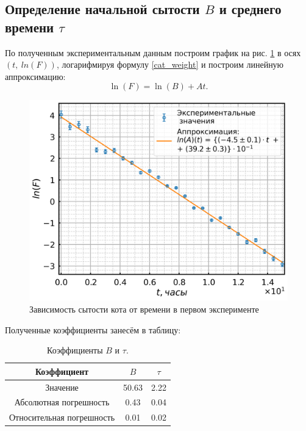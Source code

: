 \documentclass[12pt,a4paper]{article}
\begin{document}
\subsection{Определение начальной сытости $B$ и среднего времени $\tau$}

По полученным экспериментальным данным построим график на рис. \ref{fig_1} в осях $(t,~ ln(F))$, логарифмируя формулу \eqref{cat_weight} и построим линейную аппроксимацию:
    \begin{equation}
        \ln(F) = \ln(B) + At.
    \end{equation}

\begin{figure}[h!]
    \begin{center}
    		\includegraphics[scale=0.55]{plot_1.png}
    \caption{Зависимость сытости кота от времени в первом эксперименте}\label{fig_1}
    \end{center}
	\end{figure}

Полученные коэффициенты занесём в таблицу:

\begin{table}[h!]
    \centering
    \caption{Коэффициенты $B$ и $\tau$.}\label{table:atau}
	\begin{tabular}{ |c|c|c|}
 \hline
Коэффициент & $B$ & $\tau$ \\
 \hline
 Значение & 50.63 & 2.22 \\ \hline
 Абсолютная погрешность & 0.43 & 0.04 \\ \hline
 Относительная погрешность & 0.01 & 0.02 \\ \hline
	\end{tabular}

\end{table}
\end{document}
